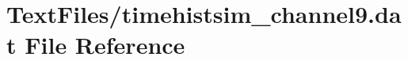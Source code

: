 \hypertarget{TextFiles_2timehistsim__channel9_8dat}{}\section{Text\+Files/timehistsim\+\_\+channel9.dat File Reference}
\label{TextFiles_2timehistsim__channel9_8dat}

